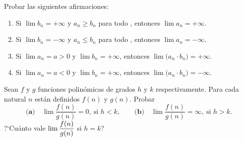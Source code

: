 \item Probar las siguientes afirmaciones:
\begin{enumerate}
    \item Si $\lim b_n = +\infty$ y $a_n \ge b_n$ para todo \niN, entonces $\lim a_n = +\infty$.
    \item Si $\lim b_n = -\infty$ y $a_n \le b_n$ para todo \niN, entonces $\lim a_n = -\infty$.
    \item Si $\lim a_n = a > 0$ y $\lim b_n = +\infty$, entonces $\lim\big(a_n\cdot b_n\big) = +\infty$.
    \item Si $\lim a_n = a < 0$ y $\lim b_n = +\infty$, entonces $\lim\big(a_n\cdot b_n\big) = -\infty$.
\end{enumerate}

\item Sean $f$ y $g$ funciones polinómicas de grados $h$ y $k$ respectivamente. Para cada natural $n$ están definidos $f(n)$ y $g(n)$. Probar
\[
\textbf{(a)}\quad \lim\frac{f(n)}{g(n)} = 0, \ \text{si $h<k$},
\qquad
\textbf{(b)}\quad \lim\frac{f(n)}{g(n)} = \infty, \ \text{si $h>k$}.
\]
?`Cuánto vale $\displaystyle \lim\frac{f(n)}{g(n)}$ si $h=k$?

